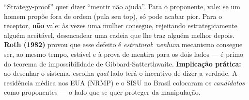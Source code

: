 \documentclass[11pt,a4paper]{article}
\begin{document}
\begin{enumerate}[leftmargin=2em,itemsep=4pt]
\begin{empalavras}
\smallskip\noindent
``Strategy-proof'' quer dizer ``mentir não ajuda''. Para o proponente, vale: se um homem propõe
fora de ordem (pula seu top), só pode acabar pior. Para o receptor, \textbf{não} vale: às vezes
uma mulher consegue, rejeitando estrategicamente alguém aceitável, desencadear uma cadeia que
lhe traz alguém melhor depois. \textbf{Roth (1982)} provou que esse defeito é \emph{estrutural}:
\emph{nenhum} mecanismo consegue ser, ao mesmo tempo, estável e à prova de mentira para os dois
lados — é primo do teorema de impossibilidade de Gibbard-Satterthwaite. \textbf{Implicação
prática:} ao desenhar o sistema, escolha \emph{qual} lado terá o incentivo de dizer a verdade.
A residência médica nos EUA (NRMP) e o SISU no Brasil colocaram os \emph{candidatos} como
proponentes — o lado que se quer proteger da manipulação.
\end{empalavras}

\end{enumerate}
\end{document}
